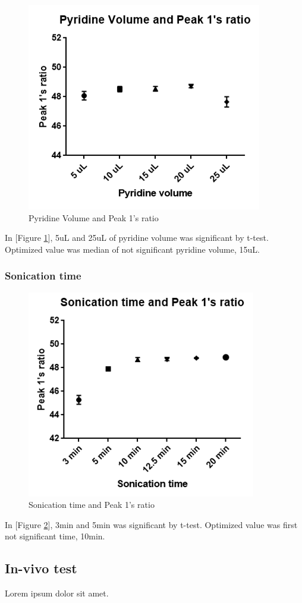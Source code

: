 \documentclass[12pt]{article} %
\begin{document}
\begin{figure}[h!]
  \centering
  \includegraphics[width=0.6\linewidth]{fig6.png}
  \caption{Pyridine Volume and Peak 1's ratio}
  \label{fig:fig6}
\end{figure}

In [Figure \ref{fig:fig6}],  5uL and 25uL of pyridine volume was significant by t-test. Optimized value was median of not significant pyridine volume, 15uL.

\subsubsection {Sonication time}

\begin{figure}[h!]
  \centering
  \includegraphics[width=0.6\linewidth]{fig7.png}
  \caption{Sonication time and Peak 1's ratio}
  \label{fig:fig7}
\end{figure}
 In [Figure \ref{fig:fig7}],  3min and 5min was significant by t-test. Optimized value was first not significant time, 10min.


\subsection {In-vivo test}
 Lorem ipsum dolor sit amet.
\end{document}
